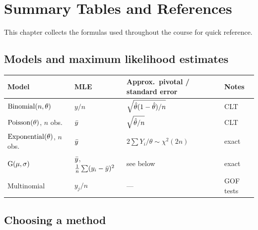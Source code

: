\chapter{Summary Tables and References}

This chapter collects the formulas used throughout the course for quick reference.

\section{Models and maximum likelihood estimates}

\begin{center}
\begin{tabular}{llll}
\toprule
Model & MLE & Approx.\ pivotal / standard error & Notes \\
\midrule
$\operatorname{Binomial}(n,\theta)$ & $y/n$ & $\sqrt{\hat{\theta}(1-\hat{\theta})/n}$ & CLT \\
$\operatorname{Poisson}(\theta)$, $n$ obs.\ & $\bar{y}$ & $\sqrt{\hat{\theta}/n}$ & CLT \\
$\operatorname{Exponential}(\theta)$, $n$ obs.\ & $\bar{y}$ & $2\sum Y_i/\theta\sim\chi^2(2n)$ & exact \\
$\operatorname{G}(\mu,\sigma)$ & $\bar{y}$, $\frac1n\sum(y_i-\bar{y})^2$ & see below & exact \\
Multinomial & $y_j/n$ & --- & GOF tests \\
\bottomrule
\end{tabular}
\end{center}


\section{Choosing a method}


